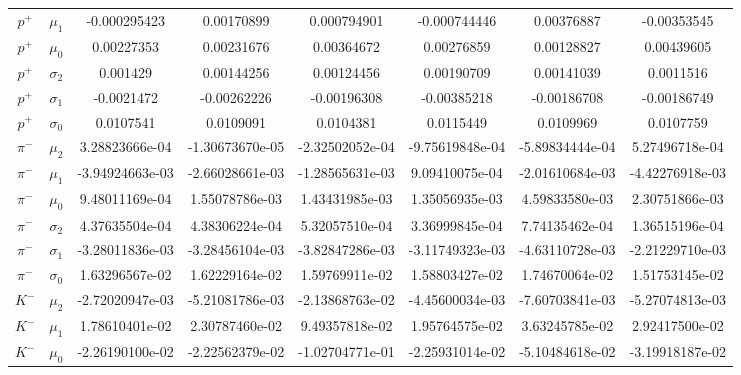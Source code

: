 \begin{landscape}
\begin{table}
\begin{tabular}{c|c|c|c|c|c|c|c}
     $p^+$ & $\mu_1$ & -0.000295423 &         0.00170899 &        0.000794901 &       -0.000744446 &         0.00376887 &        -0.00353545 \\
     $p^+$ & $\mu_0$ & 0.00227353 &         0.00231676 &         0.00364672 &         0.00276859 &         0.00128827 &          0.00439605 \\
  $p^+$ & $\sigma_2$ & 0.001429 &         0.00144256 &         0.00124456 &         0.00190709 &         0.00141039 &          0.0011516 \\
  $p^+$ & $\sigma_1$ & -0.0021472 &        -0.00262226 &        -0.00196308 &        -0.00385218 &        -0.00186708 &        -0.00186749 \\
  $p^+$ & $\sigma_0$ & 0.0107541 &          0.0109091 &          0.0104381 &          0.0115449 &          0.0109969 &          0.0107759 \\
      $\pi^-$ & $\mu_2$ & 3.28823666e-04 &    -1.30673670e-05 &    -2.32502052e-04 &    -9.75619848e-04 &    -5.89834444e-04 &     5.27496718e-04 \\
      $\pi^-$ & $\mu_1$ & -3.94924663e-03 &    -2.66028661e-03 &    -1.28565631e-03 &     9.09410075e-04 &    -2.01610684e-03 &    -4.42276918e-03 \\
      $\pi^-$ & $\mu_0$ & 9.48011169e-04 &     1.55078786e-03 &     1.43431985e-03 &     1.35056935e-03 &     4.59833580e-03 &     2.30751866e-03 \\
   $\pi^-$ & $\sigma_2$ & 4.37635504e-04 &     4.38306224e-04 &    5.32057510e-04 &     3.36999845e-04 &     7.74135462e-04 &     1.36515196e-04 \\
   $\pi^-$ & $\sigma_1$ & -3.28011836e-03 &    -3.28456104e-03 &    -3.82847286e-03 &     -3.11749323e-03 &    -4.63110728e-03 &    -2.21229710e-03 \\
   $\pi^-$ & $\sigma_0$ & 1.63296567e-02 &     1.62229164e-02 &    1.59769911e-02 &     1.58803427e-02 &     1.74670064e-02 &     1.51753145e-02 \\
       $K^-$ & $\mu_2$ & -2.72020947e-03 &    -5.21081786e-03 &    -2.13868763e-02 &    -4.45600034e-03 &    -7.60703841e-03 &    -5.27074813e-03 \\
       $K^-$ & $\mu_1$ & 1.78610401e-02 &      2.30787460e-02 &     9.49357818e-02 &     1.95764575e-02 &     3.63245785e-02 &     2.92417500e-02 \\
       $K^-$ & $\mu_0$ & -2.26190100e-02 &    -2.22562379e-02 &     -1.02704771e-01 &    -2.25931014e-02 &    -5.10484618e-02 &    -3.19918187e-02 \\

\end{tabular}
\end{table}
\end{landscape}
